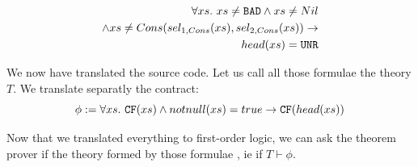 \documentclass[preprint]{sigplanconf}
\begin{document}
\begin{align*}
 \forall xs.~xs \neq \texttt{BAD} \land xs \neq Nil \notag \\
 \land xs \neq Cons(sel_{1,Cons}(xs),sel_{2,Cons}(xs)) \to  \notag \\
 head(xs) = \texttt{UNR} 
\end{align*}

We now have translated the source code. Let us call all those formulae
the theory $T$. We translate separatly the contract:
\begin{equation*}
  \phi := \forall xs.~\texttt{CF}(xs) \land notnull(xs) = true \to \texttt{CF}(head(xs)) 
\end{equation*}

Now that we translated everything to first-order logic, we can ask the
theorem prover if the theory formed by those formulae , ie if $T \vdash \phi$.
\end{document}
